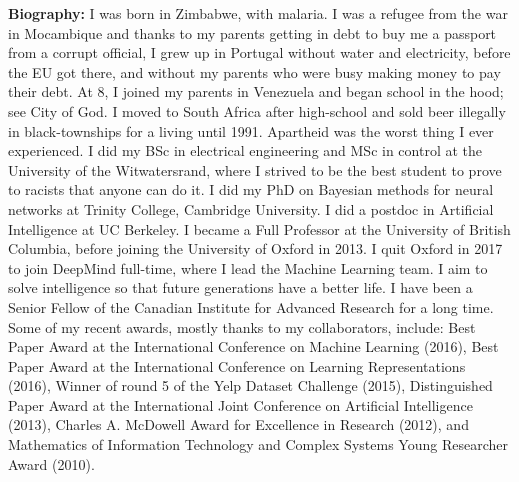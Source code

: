 {\bfseries Biography:} 
I was born in Zimbabwe, with malaria. I was a refugee from the war in Mocambique and thanks to my parents getting in debt to buy me a passport from a corrupt official, I grew up in Portugal without water and electricity, before the EU got there, and without my parents who were busy making money to pay their debt. At 8, I joined my parents in Venezuela and began school in the hood; see City of God. I moved to South Africa after high-school and sold beer illegally in black-townships for a living until 1991. Apartheid was the worst thing I ever experienced. I did my BSc in electrical engineering and MSc in control at the University of the Witwatersrand, where I strived to be the best student to prove to racists that anyone can do it. I did my PhD on Bayesian methods for neural networks at Trinity College, Cambridge University. I did a postdoc in Artificial Intelligence at UC Berkeley. I became a Full Professor at the University of British Columbia, before joining the University of Oxford in 2013. I quit Oxford in 2017 to join DeepMind full-time, where I lead the Machine Learning team. I aim to solve intelligence so that future generations have a better life. I have been a Senior Fellow of the Canadian Institute for Advanced Research for a long time. Some of my recent awards, mostly thanks to my collaborators, include: Best Paper Award at the International Conference on Machine Learning (2016), Best Paper Award at the International Conference on Learning Representations (2016), Winner of round 5 of the Yelp Dataset Challenge (2015), Distinguished Paper Award at the International Joint Conference on Artificial Intelligence (2013), Charles A. McDowell Award for Excellence in Research (2012), and Mathematics of Information Technology and Complex Systems Young Researcher Award (2010). 

\newpage
